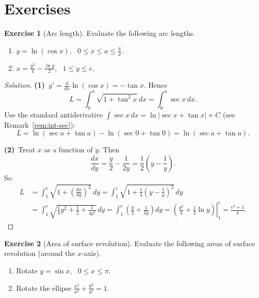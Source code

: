 \documentclass[11pt]{article}
\theoremstyle{definition}
\newtheorem{exercise}{Exercise}[section]
\newenvironment{solution}{\begin{proof}[Solution]}{\end{proof}}
\theoremstyle{remark}
\begin{document}
\section{Exercises}

\begin{exercise}[Arc length]
Evaluate the following arc lengths.
\begin{enumerate}
  \item $y=\ln(\cos x)$, \ $0\le x\le a\le\frac{\pi}{2}$.
  \item $x=\frac{y^2}{4}-\frac{\ln y}{2}$, \ $1\le y\le e$.
\end{enumerate}
\end{exercise}

\begin{solution}
\textbf{(1)}\,
$y'=\frac{d}{dx}\ln(\cos x)=-\tan x$. Hence
\[
L=\int_{0}^{a}\sqrt{1+\tan^{2}x}\,dx=\int_{0}^{a}\sec x\,dx.
\]
Use the standard antiderivative $\int \sec x\,dx=\ln|\sec x+\tan x|+C$ (see Remark~\ref{rem:int-sec}):
\[
L=\ln(\sec a+\tan a)-\ln(\sec 0+\tan 0)=\ln(\sec a+\tan a).
\]

\textbf{(2)}\,
Treat $x$ as a function of $y$. Then
\[
\frac{dx}{dy}=\frac{y}{2}-\frac{1}{2y}=\frac{1}{2}\left(y-\frac{1}{y}\right).
\]
So
\begin{align*}
L
&=\int_{1}^{e}\sqrt{1+\left(\frac{dx}{dy}\right)^{2}}\,dy
=\int_{1}^{e}\sqrt{1+\frac{1}{4}\left(y-\frac{1}{y}\right)^{2}}\,dy \\
&=\int_{1}^{e}\sqrt{\frac{1}{4}y^{2}+\frac{1}{2}+\frac{1}{4y^{2}}}\,dy
=\int_{1}^{e}\left(\frac{y}{2}+\frac{1}{2y}\right)dy
=\left.\left(\frac{y^{2}}{4}+\frac{1}{2}\ln y\right)\right|_{1}^{e}
=\frac{e^{2}+1}{4}.
\end{align*}
\end{solution}

\begin{exercise}[Area of surface revolution]
Evaluate the following areas of surface revolution (around the $x$-axis).
\begin{enumerate}
  \item Rotate $y=\sin x$, \ $0\le x\le \pi$.
  \item Rotate the ellipse $\frac{x^2}{a^2}+\frac{y^2}{b^2}=1$.
\end{enumerate}
\end{exercise}
\end{document}
